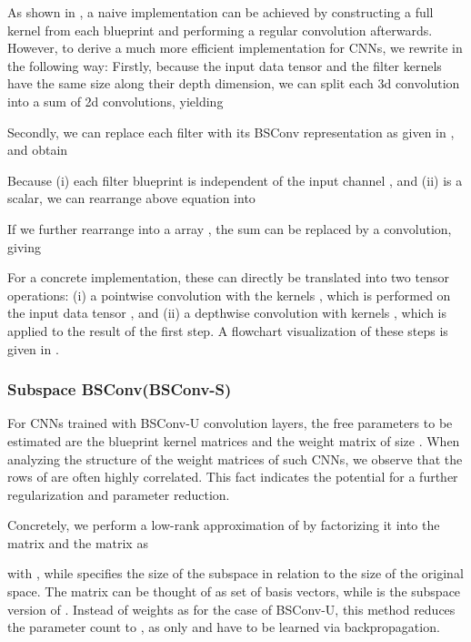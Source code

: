 \documentclass[10pt,twocolumn,letterpaper]{article}
\newcommand{\DCCK}{BSConv\xspace}
\newcommand{\DCCKU}{\DCCK-U\xspace}
\newcommand{\DCCKS}{\DCCK-S\xspace}
\begin{document}
As shown in , a naive implementation can be achieved by constructing a full kernel from each blueprint and performing a regular convolution afterwards.
However, to derive a much more efficient implementation for CNNs, we rewrite  in the following way:
Firstly, because the input data tensor  and the filter kernels  have the same size  along their depth dimension, we can split each 3d convolution into a sum of  2d convolutions, yielding

Secondly, we can replace each filter with its \DCCK representation as given in , and obtain

Because (i) each filter blueprint  is independent of the input channel , and (ii)  is a scalar, we can rearrange above equation into

If we further rearrange  into a  array , the sum can be replaced by a convolution, giving

For a concrete implementation, these  can directly be translated into two tensor operations:
(i) a  pointwise convolution with the kernels , which is performed on the input data tensor , and
(ii) a  depthwise convolution \cite{howard2017mobilenets,ioffe2015batch} with kernels , which is applied to the result of the first step.
A flowchart visualization of these steps is given in .

\subsubsection{Subspace \DCCK (\DCCKS)}
\label{subsubsec:dcckS}
For CNNs trained with \DCCKU convolution layers, the free parameters to be estimated are the  blueprint kernel matrices and the weight matrix  of size .
When analyzing the structure of the weight matrices  of such CNNs, we observe that the rows of  are often highly correlated.
This fact indicates the potential for a further regularization and parameter reduction.

Concretely, we perform a low-rank approximation of  by factorizing it into the  matrix  and the  matrix  as

with , while  specifies the size of the subspace  in relation to the size  of the original space.
The matrix  can be thought of as set of  basis vectors, while  is the subspace version of .
Instead of  weights as for the case of \DCCKU, this method reduces the parameter count to , as only  and  have to be learned via backpropagation.
\end{document}
